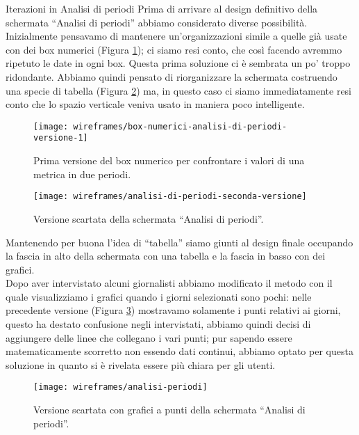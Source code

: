 \documentclass[../../../main.tex]{subfiles}
\begin{document}
\begin{bclogo}{Iterazioni in Analisi di periodi}
Prima di arrivare al design definitivo della schermata ``Analisi di periodi'' abbiamo considerato diverse possibilità.\\
Inizialmente pensavamo di mantenere un'organizzazioni simile a quelle già usate con dei box numerici (Figura \ref{fig:box-numerici-analisi-di-periodi-versione-1}); ci siamo resi conto, che così facendo avremmo ripetuto le date in ogni box. Questa prima soluzione ci è sembrata un po' troppo ridondante. Abbiamo quindi pensato di riorganizzare la schermata costruendo una specie di tabella (Figura \ref{fig:analisi-di-periodi-seconda-versione}) ma, in questo caso ci siamo immediatamente resi conto che lo spazio verticale veniva usato in maniera poco intelligente.
\begin{figure}[H]
    \centering
    \texttt{[image: wireframes/box-numerici-analisi-di-periodi-versione-1]}
    \caption{Prima versione del box numerico per confrontare i valori di una metrica in due periodi.}\label{fig:box-numerici-analisi-di-periodi-versione-1}
\end{figure}
\begin{figure}[H]
    \centering
    \texttt{[image: wireframes/analisi-di-periodi-seconda-versione]}
    \caption{Versione scartata della schermata ``Analisi di periodi''.}
    \label{fig:analisi-di-periodi-seconda-versione}
\end{figure}

Mantenendo per buona l'idea di ``tabella'' siamo giunti al design finale occupando la fascia in alto della schermata con una tabella e la fascia in basso con dei grafici.\\
Dopo aver intervistato alcuni giornalisti abbiamo modificato il metodo con il quale visualizziamo i grafici quando i giorni selezionati sono pochi: nelle precedente versione (Figura \ref{fig:old-analisi-periodo}) mostravamo solamente i punti relativi ai giorni, questo ha destato confusione negli intervistati, abbiamo quindi decisi di aggiungere delle linee che collegano i vari punti; pur sapendo essere matematicamente scorretto non essendo dati continui, abbiamo optato per questa soluzione in quanto si è rivelata essere più chiara per gli utenti.
\begin{figure}[H]
    \centering
    \texttt{[image: wireframes/analisi-periodi]}
    \caption{Versione scartata con grafici a punti della schermata ``Analisi di periodi''.}
    \label{fig:old-analisi-periodo}
\end{figure}
\end{bclogo}
\clearpage
\end{document}
